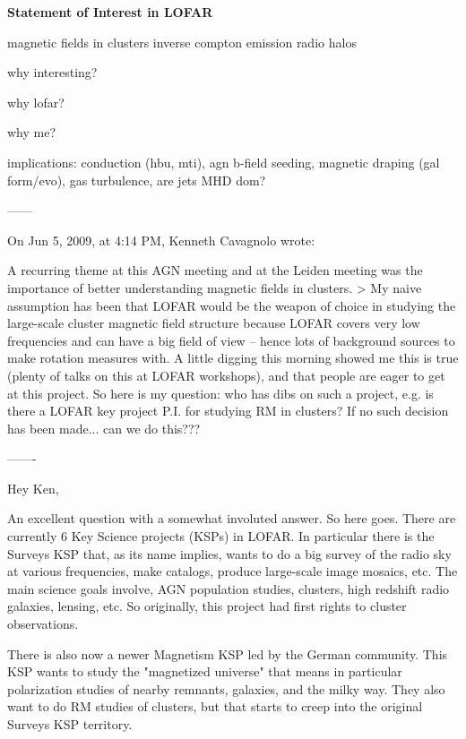 \documentclass[11pt]{article}
\begin{document}
\begin{center}
\LARGE
\textbf{Statement of Interest in LOFAR}
\normalsize
\end{center}

\cite{accept}

magnetic fields in clusters
inverse compton emission
radio halos

why interesting?

why lofar?

why me?

implications: conduction (hbu, mti), agn b-field seeding, magnetic
draping (gal form/evo), gas turbulence, are jets MHD dom?

------

On Jun 5, 2009, at 4:14 PM, Kenneth Cavagnolo wrote:

A recurring theme at this AGN meeting and at the Leiden meeting was
the importance of better understanding magnetic fields in clusters.  >
My naive assumption has been that LOFAR would be the weapon of choice
in studying the large-scale cluster magnetic field structure because
LOFAR covers very low frequencies and can have a big field of view --
hence lots of background sources to make rotation measures with. A
little digging this morning showed me this is true (plenty of talks on
this at LOFAR workshops), and that people are eager to get at this
project.  So here is my question: who has dibs on such a project, e.g.
is there a LOFAR key project P.I. for studying RM in clusters? If no
such decision has been made... can we do this???

-------

Hey Ken,

An excellent question with a somewhat involuted answer. So here goes.
There are currently 6 Key Science projects (KSPs) in LOFAR. In
particular there is the Surveys KSP that, as its name implies, wants
to do a big survey of the radio sky at various frequencies, make
catalogs, produce large-scale image mosaics, etc. The main science
goals involve, AGN population studies, clusters, high redshift radio
galaxies, lensing, etc. So originally, this project had first rights
to cluster observations.

There is also now a newer Magnetism KSP led by the German community.
This KSP wants to study the "magnetized universe" that means in
particular polarization studies of nearby remnants, galaxies, and the
milky way. They also want to do RM studies of clusters, but that
starts to creep into the original Surveys KSP territory.
\end{document}
